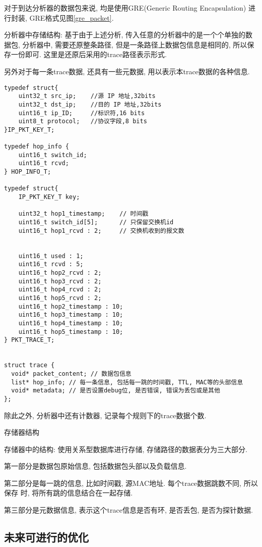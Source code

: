 {\begin{mdframed}[everyline=true]
对于到达分析器的数据包来说, 均是使用GRE(Generic Routing Encapsulation)
进行封装, GRE格式见图\ref{gre_packet}.

分析器中存储结构: 基于由于上述分析,
传入任意的分析器中的是一个个单独的数据包, 分析器中, 需要还原整条路径,
但是一条路径上数据包信息是相同的, 所以保存一份即可.
这里是还原后采用的trace路径表示形式.

另外对于每一条trace数据, 还具有一些元数据,
用以表示本trace数据的各种信息.

\begin{lstlisting}
typedef struct{
    uint32_t src_ip;    //源 IP 地址,32bits
    uint32_t dst_ip;    //目的 IP 地址,32bits
    uint16_t ip_ID;     //标识符,16 bits
    uint8_t protocol;   //协议字段,8 bits
}IP_PKT_KEY_T;

typedef hop_info {
    uint16_t switch_id;
    uint16_t rcvd;
} HOP_INFO_T;

typedef struct{
    IP_PKT_KEY_T key;

    uint32_t hop1_timestamp;    // 时间戳
    uint16_t switch_id[5];      // 只保留交换机id
    uint16_t hop1_rcvd : 2;     // 交换机收到的报文数


    uint16_t used : 1;
    uint16_t rcvd : 5;
    uint16_t hop2_rcvd : 2;
    uint16_t hop3_rcvd : 2;
    uint16_t hop4_rcvd : 2;
    uint16_t hop5_rcvd : 2;
    uint16_t hop2_timestamp : 10;
    uint16_t hop3_timestamp : 10;
    uint16_t hop4_timestamp : 10;
    uint16_t hop5_timestamp : 10;
} PKT_TRACE_T;


struct trace {
  void* packet_content; // 数据包信息
  list* hop_info; // 每一条信息, 包括每一跳的时间戳, TTL, MAC等的头部信息
  void* metadata; // 是否设置debug位, 是否错误, 错误为丢包或是其他
};
\end{lstlisting}

除此之外, 分析器中还有计数器, 记录每个规则下的trace数据个数.

存储器结构

存储器中的结构: 使用关系型数据库进行存储, 存储路径的数据表分为三大部分.

第一部分是数据包原始信息, 包括数据包头部以及负载信息.

第二部分是每一跳的信息, 比如时间戳, 源MAC地址. 每个trace数据跳数不同,
所以保存 时, 将所有跳的信息结合在一起存储.

第三部分是元数据信息, 表示这个trace信息是否有环, 是否丢包,
是否为探针数据.

\subsection{未来可进行的优化}


\end{mdframed}}
